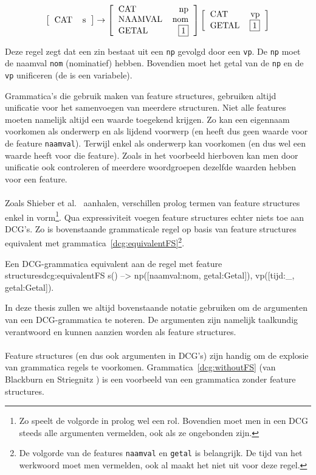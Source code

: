 \[
  \fstructure{
    \feature{CAT}{s}
  }
  \rightarrow
  \fstructure{
    \feature{CAT}{np}
    \feature{NAAMVAL}{nom}
    \feature{GETAL}{\fvariable{1}}
  }
  \fstructure{
    \feature{CAT}{vp}
    \feature{GETAL}{\fvariable{1}}
  }
\]

Deze regel zegt dat een zin bestaat uit een \texttt{np} gevolgd door een \texttt{vp}. De \texttt{np} moet de naamval \texttt{nom} (nominatief) hebben. Bovendien moet het getal van de \texttt{np} en de \texttt{vp} unificeren (de  is een variabele).

Grammatica's die gebruik maken van feature structures, gebruiken altijd unificatie voor het samenvoegen van meerdere structuren. Niet alle features moeten namelijk altijd een waarde toegekend krijgen. Zo kan een eigennaam voorkomen als onderwerp en als lijdend voorwerp (en heeft dus geen waarde voor de feature \texttt{naamval}). Terwijl  enkel als onderwerp kan voorkomen (en dus wel een waarde heeft voor die feature). Zoals in het voorbeeld hierboven kan men door unificatie ook controleren of meerdere woordgroepen dezelfde waarden hebben voor een feature.

\paragraph{} Zoals Shieber et al.\ \cite{Shieber2003} aanhalen, verschillen prolog termen van feature structures enkel in vorm\footnote{Zo speelt de volgorde in prolog wel een rol. Bovendien moet men in een DCG steeds alle argumenten vermelden, ook als ze ongebonden zijn.}. Qua expressiviteit voegen feature structures echter niets toe aan DCG's. Zo is bovenstaande grammaticale regel op basis van feature structures equivalent met grammatica~\ref{dcg:equivalentFS}\footnote{De volgorde van de features \texttt{naamval} en \texttt{getal} is belangrijk. De tijd van het werkwoord moet men vermelden, ook al maakt het niet uit voor deze regel.}.

\begin{dcg}{Een DCG-grammatica equivalent aan de regel met feature structures}{dcg:equivalentFS}
s() --> np([naamval:nom, getal:Getal]), vp([tijd:_, getal:Getal]).
\end{dcg}

In deze thesis zullen we altijd bovenstaande notatie gebruiken om de argumenten van een DCG-grammatica te noteren. De argumenten zijn namelijk taalkundig verantwoord en kunnen aanzien worden als feature structures.

\paragraph{} Feature structures (en dus ook argumenten in DCG's) zijn handig om de explosie van grammatica regels te voorkomen. Grammatica~\ref{dcg:withoutFS} (van Blackburn en Striegnitz \cite{NLPCourse}) is een voorbeeld van een grammatica zonder feature structures.


